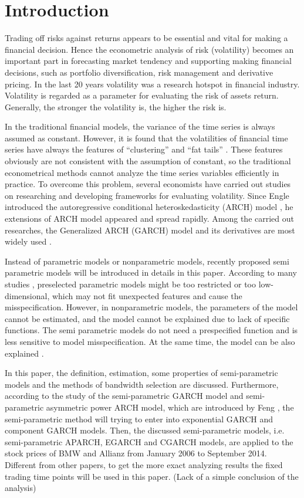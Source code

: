 \chapter{Introduction}\label{secIntroduction}
Trading off risks against returns appears to be essential and vital for making a financial decision. Hence the econometric analysis of risk (volatility) becomes an important part in forecasting market tendency and supporting making financial decisions, such as portfolio diversification, risk management and derivative pricing. In the last 20 years volatility was a research hotspot in financial industry. Volatility is regarded as a parameter for evaluating the risk of assets return. Generally, the stronger the volatility is, the higher the risk is.

In the traditional financial models, the variance of the time series is always assumed as constant. However, it is found that the volatilities of financial time series have always the features of “clustering” and “fat tails”  \citep{Mandelbrot1963,EugeneF.Fama1965}. These features obviously are not consistent with the assumption of constant, so the traditional econometrical methods cannot analyze the time series variables efficiently in practice. To overcome this problem, several economists have carried out studies on researching and developing frameworks for evaluating volatility. Since Engle introduced the autoregressive conditional heteroskedasticity (ARCH) model \citep{Engle1982}, he extensions of ARCH model appeared and spread rapidly. Among the carried out researches, the Generalized ARCH (GARCH) model and its derivatives are most widely used \citep{Bollerslev1986}.

Instead of parametric models or nonparametric models, recently proposed semi parametric models will be introduced in details in this paper. According to many studies \citep{Gourieroux1992,Eubank1993}, preselected parametric models might be too restricted or too low-dimensional, which may not fit unexpected features and cause the misspecification. However, in nonparametric models, the parameters of the model cannot be estimated, and the model cannot be explained due to lack of specific functions. The semi parametric models do not need a prespecified function and is less sensitive to model misspecification. At the same time, the model can be also explained \citep{Di2011}.

In this paper, the definition, estimation, some properties of semi-parametric models and the methods of bandwidth selection are discussed. Furthermore, according to the study of the semi-parametric GARCH model and semi-parametric asymmetric power ARCH model, which are introduced by Feng \citep{Feng2004,FengYuanhua;Sun2013}, the semi-parametric method will trying to enter into exponential GARCH and component GARCH models. Then, the discussed semi-parametric models, i.e. semi-parametric APARCH, EGARCH and CGARCH models, are applied to the stock prices of BMW and Allianz from January 2006 to September 2014. Different from other papers, to get the more exact analyzing results the fixed trading time points will be used in this paper. (Lack of a simple conclusion of the analysis)

